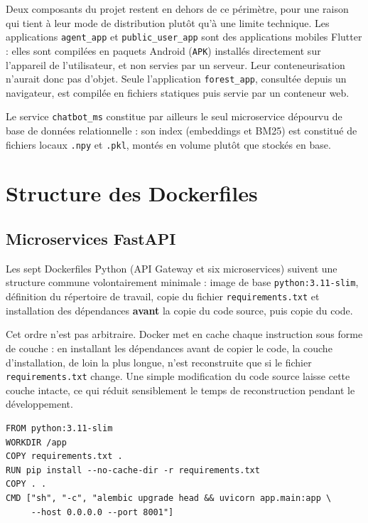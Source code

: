 Deux composants du projet restent en dehors de ce périmètre, pour une raison
qui tient à leur mode de distribution plutôt qu'à une limite technique. Les
applications \texttt{agent\_app} et \texttt{public\_user\_app} sont des
applications mobiles Flutter : elles sont compilées en paquets Android
(\texttt{APK}) installés directement sur l'appareil de l'utilisateur, et non
servies par un serveur. Leur conteneurisation n'aurait donc pas d'objet.
Seule l'application \texttt{forest\_app}, consultée depuis un navigateur, est
compilée en fichiers statiques puis servie par un conteneur web.

Le service \texttt{chatbot\_ms} constitue par ailleurs le seul microservice
dépourvu de base de données relationnelle : son index (embeddings et BM25)
est constitué de fichiers locaux \texttt{.npy} et \texttt{.pkl}, montés en
volume plutôt que stockés en base.

\section*{Structure des Dockerfiles}

\subsection*{Microservices FastAPI}

Les sept Dockerfiles Python (API Gateway et six microservices) suivent une
structure commune volontairement minimale : image de base
\texttt{python:3.11-slim}, définition du répertoire de travail, copie du
fichier \texttt{requirements.txt} et installation des dépendances
\textbf{avant} la copie du code source, puis copie du code.

Cet ordre n'est pas arbitraire. Docker met en cache chaque instruction sous
forme de couche : en installant les dépendances avant de copier le code, la
couche d'installation, de loin la plus longue, n'est reconstruite que si le
fichier \texttt{requirements.txt} change. Une simple modification du code
source laisse cette couche intacte, ce qui réduit sensiblement le temps de
reconstruction pendant le développement.

\begin{verbatim}
FROM python:3.11-slim
WORKDIR /app
COPY requirements.txt .
RUN pip install --no-cache-dir -r requirements.txt
COPY . .
CMD ["sh", "-c", "alembic upgrade head && uvicorn app.main:app \
     --host 0.0.0.0 --port 8001"]
\end{verbatim}

